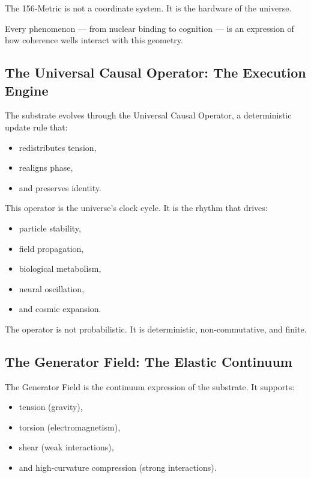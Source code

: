 \documentclass[reprint,amsmath,amssymb,aps,prl,floatfix]{revtex4-2}
\begin{document}
\begin{itemize}
The 156‑Metric is not a coordinate system.  
It is the hardware of the universe.
\medskip

Every phenomenon — from nuclear binding to cognition — is an expression of how coherence wells interact with this geometry.

\subsection{The Universal Causal Operator: The Execution Engine}

The substrate evolves through the Universal Causal Operator, a deterministic update rule that:

\begin{itemize}
\item redistributes tension,  
\item realigns phase,  
\item and preserves identity.
\end{itemize}
\medskip

This operator is the universe’s clock cycle.  
It is the rhythm that drives:

\begin{itemize}
\item particle stability,  
\item field propagation,  
\item biological metabolism,  
\item neural oscillation,  
\item and cosmic expansion.
\end{itemize}
\medskip

The operator is not probabilistic.  
It is deterministic, non‑commutative, and finite.

\subsection{The Generator Field: The Elastic Continuum}

The Generator Field is the continuum expression of the substrate. It supports:

\begin{itemize}
\item tension (gravity),  
\item torsion (electromagnetism),  
\item shear (weak interactions),  
\item and high‑curvature compression (strong interactions).
\end{itemize}
\medskip


\end{itemize}
\end{document}
